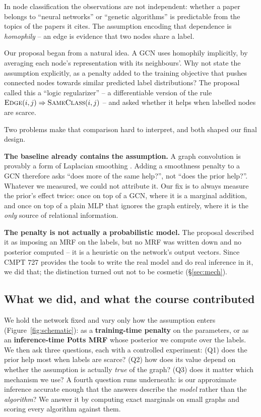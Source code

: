 \documentclass{article}
\begin{document}
In node classification the observations are not independent: whether a paper belongs to
``neural networks'' or ``genetic algorithms'' is predictable from the topics of the papers it
cites. The assumption encoding that dependence is \emph{homophily} -- an edge is evidence that
two nodes share a label.

Our proposal began from a natural idea. A GCN \citep{kipf2017semi} uses homophily implicitly, by
averaging each node's representation with its neighbours'. Why not state the assumption
explicitly, as a penalty added to the training objective that pushes connected nodes towards
similar predicted label distributions? The proposal called this a ``logic regularizer'' -- a
differentiable version of the rule $\textsc{Edge}(i,j)\Rightarrow\textsc{SameClass}(i,j)$ -- and
asked whether it helps when labelled nodes are scarce.

Two problems make that comparison hard to interpret, and both shaped our final design.

\textbf{The baseline already contains the assumption.} A graph convolution is provably a form of
Laplacian smoothing \citep{li2018deeper}. Adding a smoothness penalty to a GCN therefore asks
``does more of the same help?'', not ``does the prior help?''. Whatever we measured, we could not
attribute it. Our fix is to always measure the prior's effect twice: once on top of a GCN, where
it is a marginal addition, and once on top of a plain MLP that ignores the graph entirely, where
it is the \emph{only} source of relational information.

\textbf{The penalty is not actually a probabilistic model.} The proposal described it as imposing
an MRF on the labels, but no MRF was written down and no posterior computed -- it is a heuristic
on the network's output vectors. Since CMPT 727 provides the tools to write the real model and
do real inference in it, we did that; the distinction turned out not to be cosmetic
(\S\ref{sec:mech}).

\subsection{What we did, and what the course contributed}

We hold the network fixed and vary only how the assumption enters (Figure~\ref{fig:schematic}):
as a \textbf{training-time penalty} on the parameters, or as an \textbf{inference-time Potts
MRF} whose posterior we compute over the labels. We then ask three questions, each with a
controlled experiment: (Q1) does the prior help most when labels are scarce? (Q2) how does its
value depend on whether the assumption is actually \emph{true} of the graph? (Q3) does it matter
which mechanism we use? A fourth question runs underneath: is our approximate inference accurate
enough that the answers describe the \emph{model} rather than the \emph{algorithm}? We answer it
by computing exact marginals on small graphs and scoring every algorithm against them.
\end{document}
